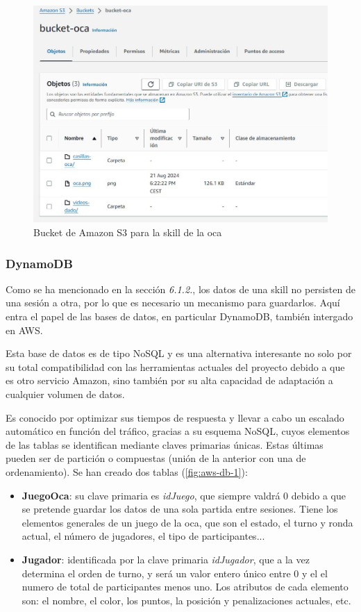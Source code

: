 \begin{figure}[H]
	\centering
	\includegraphics[width=1\textwidth]{imgs/aws-s3-1.jpg}
	\caption{Bucket de Amazon S3 para la skill de la oca}
	\label{fig:aws-s3-1}
\end{figure}

\subsubsection{DynamoDB}

Como se ha mencionado en la sección \textit{6.1.2.}, los datos de una skill no persisten de una sesión a otra, por lo que es necesario un mecanismo para guardarlos. Aquí entra el papel de las bases de datos, en particular DynamoDB, también intergado en AWS.

Esta base de datos es de tipo NoSQL y es una alternativa interesante no solo por su total compatibilidad con las herramientas actuales del proyecto debido a que es otro servicio Amazon, sino también por su alta capacidad de adaptación a cualquier volumen de datos. 

Es conocido por optimizar sus tiempos de respuesta y llevar a cabo un escalado automático en función del tráfico, gracias a su esquema NoSQL, cuyos elementos de las tablas se identifican mediante claves primarias únicas. Estas últimas pueden ser de partición o compuestas (unión de la anterior con una de ordenamiento). Se han creado dos tablas (\autoref{fig:aws-db-1}): 
\begin{itemize}
	\item \textbf{JuegoOca}: su clave primaria es \textit{idJuego}, que siempre valdrá 0 debido a que se pretende guardar los datos de una sola partida entre sesiones. Tiene los elementos generales de un juego de la oca, que son el estado, el turno y ronda actual, el número de jugadores, el tipo de participantes...
	\item \textbf{Jugador}: identificada por la clave primaria \textit{idJugador}, que a la vez determina el orden de turno, y será un valor entero único entre 0 y el el numero de total de participantes menos uno. Los atributos de cada elemento son: el nombre, el color, los puntos, la posición y penalizaciones actuales, etc.
\end{itemize} 

